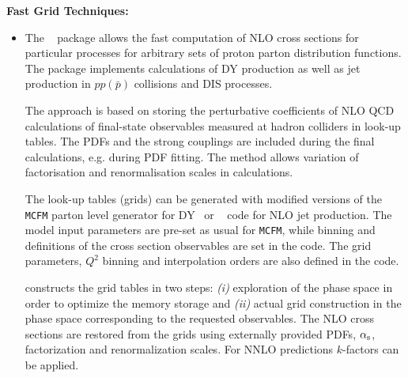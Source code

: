 \begin{description}
\begin{itemize}
\end{itemize}


\vspace*{0.25cm}
\item \bf {Fast Grid Techniques:} \rm


\begin{itemize}
    \item The \applgrid~\cite{Carli:2010rw} package allows the fast computation 
of NLO cross sections for particular processes for arbitrary sets of 
proton parton distribution functions. The package implements
calculations of DY production as well as jet production in $pp(\bar p)$
collisions and DIS processes. 

The approach is based on storing the perturbative coefficients
of NLO QCD calculations of final-state observables measured
at hadron colliders in look-up tables. The PDFs and the 
strong couplings are included during the final calculations,
e.g. during PDF fitting. The method allows 
variation of factorisation and renormalisation scales in
calculations.

The look-up tables (grids) can be generated with modified versions
of the \texttt{MCFM} parton level generator for DY~\cite{Campbell:1999ah,Campbell:2000je,Campbell:2010ff} 
or \nlojetpp~\cite{Nagy:1998bb,Nagy:2001fj} code for NLO jet production.
The model input parameters are pre-set as usual for \texttt{MCFM}, 
while binning and definitions of the
cross section observables are set in the \applgrid code.
%
The grid parameters, \(Q^2\) binning
and interpolation orders are also defined in the code.

\applgrid constructs the grid tables in two 
steps: {\it (i)} exploration of the phase space in order
to optimize the memory storage and {\it (ii)} actual grid
construction in the phase space corresponding to the 
requested observables.
The NLO cross sections are restored from the grids
using externally provided PDFs, $\alpha_\mathrm{s}$, factorization and 
renormalization scales. For NNLO predictions $k$-factors can be applied.


\end{itemize}
\end{description}
